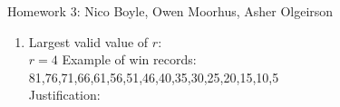 \documentclass[12pt]{article}
\begin{document}
  
\pagestyle{empty}
 



%
%
%

Homework 3: Nico Boyle, Owen Moorhus, Asher Olgeirson

\begin{enumerate}








\item

{\color{blue}
Largest valid value of $r$:  \\

$r=4$
\vskip1cm
Example of win records: \\

81,76,71,66,61,56,51,46,40,35,30,25,20,15,10,5\\

Justification: \\

}
\end{enumerate}
\end{document}
